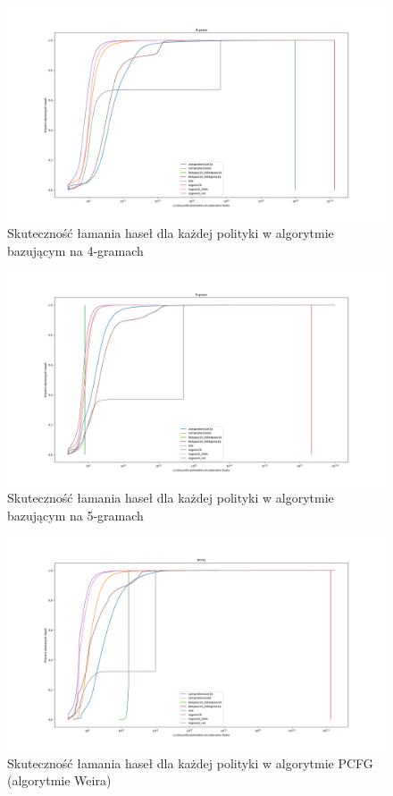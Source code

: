 \documentclass{article}
\begin{document}
	\begin{figure}[H]
		\centering
		\includegraphics[width=15cm, keepaspectratio]{4-gram}
		\caption{Skuteczność łamania haseł dla każdej polityki w algorytmie bazującym na 4-gramach}
	\end{figure}

	\begin{figure}[H]
		\centering
		\includegraphics[width=15cm, keepaspectratio]{5-gram}
		\caption{Skuteczność łamania haseł dla każdej polityki w algorytmie bazującym na 5-gramach}
	\end{figure}

	\begin{figure}[H]
		\centering
		\includegraphics[width=15cm, keepaspectratio]{PCFG}
		\caption{Skuteczność łamania haseł dla każdej polityki w algorytmie PCFG (algorytmie Weira)}
	\end{figure}
\end{document}

